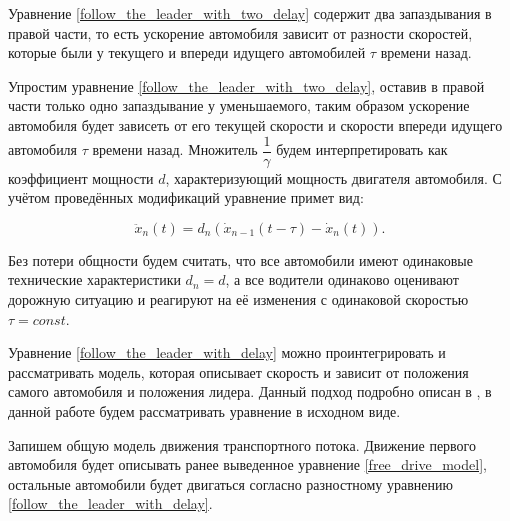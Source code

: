 \documentclass[12pt, a4paper]{extarticle}
\numberwithin{equation}{section}
\begin{document}
Уравнение \eqref{follow_the_leader_with_two_delay} содержит два запаздывания в правой части, то есть ускорение автомобиля зависит от разности скоростей, которые были у текущего и впереди идущего автомобилей $\tau$ времени назад.

Упростим уравнение \eqref{follow_the_leader_with_two_delay}, оставив в правой части только одно запаздывание у уменьшаемого, таким образом ускорение автомобиля будет зависеть от его текущей скорости и скорости впереди идущего автомобиля $\tau$ времени назад. Множитель $\dfrac{1}{\gamma}$ будем интерпретировать как коэффициент мощности $d$, характеризующий мощность двигателя автомобиля. С учётом проведённых модификаций уравнение примет вид:

\begin{equation} \label{follow_the_leader_with_delay}
\ddot{x}_n(t) = d_{n} (\dot{x}_{n-1}(t-\tau) - \dot{x}_{n}(t)).
\end{equation}

Без потери общности будем считать, что все автомобили имеют одинаковые технические характеристики $d_n = d$, а все водители одинаково оценивают дорожную ситуацию и реагируют на её изменения с одинаковой скоростью $\tau = const$.

Уравнение \eqref{follow_the_leader_with_delay} можно проинтегрировать и рассматривать модель, которая описывает скорость и зависит от положения самого автомобиля и положения лидера. Данный подход подробно описан в \cite{Course}, в данной работе будем рассматривать уравнение в исходном виде. 

Запишем общую модель движения транспортного потока. Движение первого автомобиля будет описывать ранее выведенное уравнение \eqref{free_drive_model}, остальные автомобили будет двигаться согласно разностному уравнению \eqref{follow_the_leader_with_delay}.
\end{document}
